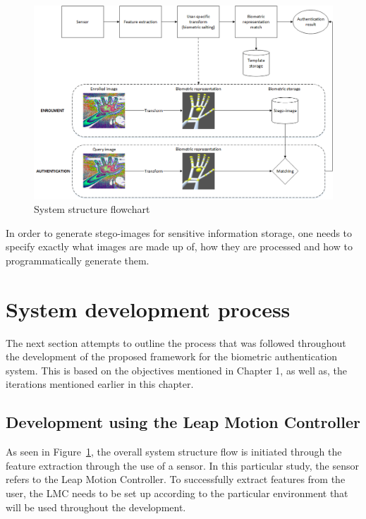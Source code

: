     
    \begin{figure}[htbp!] 
    \centering    
    \includegraphics[width=1.0\textwidth]{Chapter3/Figs/Figure3-4.png}
    \caption[System structure flowchart]{System structure flowchart}
    \label{fig:System structure flowchart}
    \end{figure}
    
In order to generate stego-images for sensitive information storage, one needs to specify exactly what images are made up of, how they are processed and how to programmatically generate them.

\section{System development process}

The next section attempts to outline the process that was followed throughout the development of the proposed framework for the biometric authentication system. This is based on the objectives mentioned in Chapter 1, as well as, the iterations mentioned earlier in this chapter.

\subsection{Development using the Leap Motion Controller}

As seen in Figure~\ref{fig:System structure flowchart}, the overall system structure flow is initiated through the feature extraction through the use of a sensor. In this particular study, the sensor refers to the Leap Motion Controller. To successfully extract features from the user, the LMC needs to be set up according to the particular environment that will be used throughout the development. 

